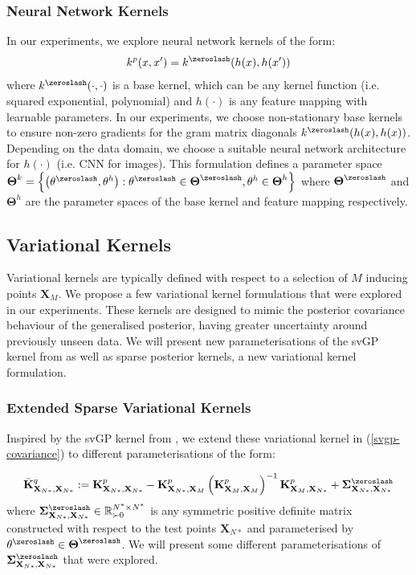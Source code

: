 \documentclass{article}
\numberwithin{equation}{section}
\begin{document}
\subsubsection{Neural Network Kernels}
In our experiments, we explore neural network kernels of the form:
\begin{align}
    k^p(x, x') = k^{\zeroslash}(h(x), h(x'))
\end{align}
where $k^{\zeroslash}(\cdot, \cdot)$ is a base kernel, which can be any kernel function (i.e. squared exponential, polynomial) and $h(\cdot)$ is any feature mapping with learnable parameters. In our experiments, we choose non-stationary base kernels to ensure non-zero gradients for the gram matrix diagonals $k^{\zeroslash}(h(x), h(x))$. Depending on the data domain, we choose a suitable neural network architecture for $h(\cdot)$ (i.e. CNN for images). This formulation defines a parameter space $\boldsymbol{\Theta}^k = \left\{\left(\theta^{\zeroslash}, \theta^h\right):  \theta^{\zeroslash} \in \boldsymbol{\Theta}^{\zeroslash}, \theta^h \in \boldsymbol{\Theta}^h\right\}$ where $\boldsymbol{\Theta}^{\zeroslash}$ and $\boldsymbol{\Theta}^h$ are the parameter spaces of the base kernel and feature mapping respectively.

\subsection{Variational Kernels}
Variational kernels are typically defined with respect to a selection of $M$ inducing points $\mathbf{X}_M$. We propose a few variational kernel formulations that were explored in our experiments. These kernels are designed to mimic the posterior covariance behaviour of the generalised posterior, having greater uncertainty around previously unseen data. We will present new parameterisations of the svGP kernel from \cite{titsias2009variational} as well as sparse posterior kernels, a new variational kernel formulation.

\subsubsection{Extended Sparse Variational Kernels}
Inspired by the svGP kernel from \cite{titsias2009variational}, we extend these variational kernel in (\ref{svgp-covariance}) to different parameterisations of the form:

\begin{align}
            \bar{\mathbf{K}}^q_{\mathbf{X}_{N*}, \mathbf{X}_{N*}} := \mathbf{K}^p_{\mathbf{X}_{N*}, \mathbf{X}_{N*}} - \mathbf{K}^p_{\mathbf{X}_{N*}, \mathbf{X}_M}\left(\mathbf{K}^p_{\mathbf{X}_{M}, \mathbf{X}_M}\right)^{-1}\mathbf{K}^p_{\mathbf{X}_M, \mathbf{X}_{N*}} + \mathbf{\Sigma}^{\zeroslash}_{\mathbf{X}_{N*}, \mathbf{X}_{N*}} 
\end{align}
where $\mathbf{\Sigma}^{\zeroslash}_{\mathbf{X}_{N*}, \mathbf{X}_{N*}} \in \mathbb{R}^{N^*\times N^*}_{\succ 0}$ is any symmetric positive definite matrix constructed with respect to the test points $\mathbf{X}_{N*}$ and parameterised by $\theta^{\zeroslash} \in \boldsymbol{\Theta}^{\zeroslash}$. We will present some different parameterisations of $\mathbf{\Sigma}^{\zeroslash}_{\mathbf{X}_{N*}, \mathbf{X}_{N*}}$ that were explored.
\end{document}
